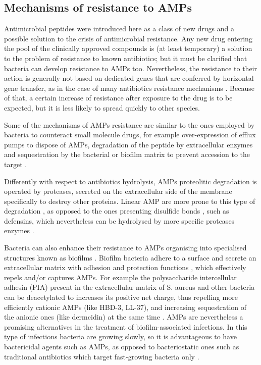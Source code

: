 \subsection{Mechanisms of resistance to AMPs}

Antimicrobial peptides were introduced here as a class of new drugs and a possible solution to the crisis of antimicrobial resistance. Any new drug entering the pool of the clinically approved compounds is (at least temporary) a solution to the problem of resistance to known antibiotics; but it must be clarified that bacteria can develop resistance to AMPs too.
%
Nevertheless, the resistance to their action is generally not based on dedicated genes that are conferred by horizontal gene transfer, as in the case of many antibiotics resistance mechanisms \citep{Peschel2006}. Because of that, a certain increase of resistance after exposure to the drug is to be expected, but it is less likely to spread quickly to other species.

Some of the mechanisms of AMPs resistance are similar to the ones employed by bacteria to counteract small molecule drugs, for example over-expression of efflux pumps to dispose of AMPs, degradation of the peptide by extracellular enzymes and sequestration by the bacterial or biofilm matrix to prevent accession to the target \citep{Peschel2006}.

Differently with respect to antibiotics hydrolysis, AMPs proteolitic degradation is operated by proteases, secreted on the extracellular side of the membrane specifically to destroy other proteins. Linear AMP are more prone to this type of degradation \citep{Sieprawska-Lupa2004}, as opposed to the ones presenting disulfide bonds \citep{Peschel2006}, such as defensins, which nevertheless can be hydrolysed by more specific proteases enzymes \citep{Nelson2011}.

Bacteria can also enhance their resistance to AMPs organising into specialised structures known as biofilms \citep{Costerton1999}. Biofilm bacteria adhere to a surface and secrete an extracellular matrix with adhesion and protection functions \citep{Jolivet-Gougeon2014}, which effectively repels and/or captures AMPs.
%
For example the polysaccharide intercellular adhesin (PIA) present in the extracellular matrix of S. aureus and other bacteria can be deacetylated to increases its positive net charge, thus repelling more efficiently cationic AMPs (like HBD-3, LL-37), and increasing sequestration of the anionic ones (like dermcidin) at the same time \citep{Vuong2004,Vuong2004PIA}.
%
AMPs are nevertheless a promising alternatives in the treatment of biofilm-associated infections. In this type of infections bacteria are growing slowly, so it is advantageous to have bactericidal agents such as AMPs, as opposed to bacteriostatic ones such as traditional antibiotics which target fast-growing bacteria only \citep{Strempel2014}.

